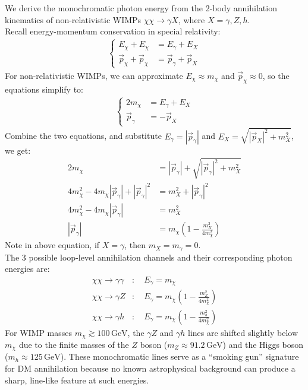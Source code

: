 \bigskip \noindent
\begin{foundation}
    We derive the monochromatic photon energy from the 2-body annihilation kinematics of non-relativistic WIMPs $\chi\chi \to \gamma X$, where $X = \gamma, Z, h$. \\

    Recall energy-momentum conservation in special relativity:
    \begin{align*}
        \begin{cases}
            E_\chi + E_\chi &= E_\gamma + E_X \\
            \vec{p}_\chi + \vec{p}_\chi &= \vec{p}_\gamma + \vec{p}_X
        \end{cases}
    \end{align*}
    For non-relativistic WIMPs, we can approximate $E_\chi \approx m_\chi$ and $\vec{p}_\chi \approx 0$, so the equations simplify to:
    \begin{align*}
        \begin{cases}
            2 m_\chi &= E_\gamma + E_X \\
            \vec{p}_\gamma &= - \vec{p}_X
        \end{cases}
    \end{align*}
    Combine the two equations, and substitute $E_\gamma = |\vec{p}_\gamma|$ and $E_X = \sqrt{|\vec{p}_X|^2 + m_X^2}$, we get:
    \begin{align*}
        2 m_\chi &= |\vec{p}_\gamma| + \sqrt{|\vec{p}_\gamma|^2 + m_X^2} \\
        4 m_\chi^2 - 4 m_\chi |\vec{p}_\gamma| + |\vec{p}_\gamma|^2 &= m_X^2 + |\vec{p}_\gamma|^2 \\
        4 m_\chi^2 - 4 m_\chi |\vec{p}_\gamma| &= m_X^2 \\
        |\vec{p}_\gamma| &= m_\chi \left(1 - \frac{m_X^2}{4 m_\chi^2}\right)
    \end{align*}
    Note in above equation, if $X = \gamma$, then $m_X = m_\gamma = 0$. \\

    The 3 possible loop-level annihilation channels and their corresponding photon energies are:
    \begin{align*}
        \chi\chi \to \gamma\gamma &: \quad E_\gamma = m_\chi \\
        \chi\chi \to \gamma Z &: \quad E_\gamma = m_\chi \left(1 - \frac{m_Z^2}{4m_\chi^2}\right) \\
        \chi\chi \to \gamma h &: \quad E_\gamma = m_\chi \left(1 - \frac{m_h^2}{4m_\chi^2}\right)
    \end{align*}
    For WIMP masses $m_\chi \gtrsim 100\,\mathrm{GeV}$, the $\gamma Z$ and $\gamma h$ lines are shifted slightly below $m_\chi$ due to the finite masses of the $Z$ boson ($m_Z \approx 91.2\,\mathrm{GeV}$) and the Higgs boson ($m_h \approx 125\,\mathrm{GeV}$). These monochromatic lines serve as a ``smoking gun'' signature for DM annihilation because no known astrophysical background can produce a sharp, line-like feature at such energies.
\end{foundation}

